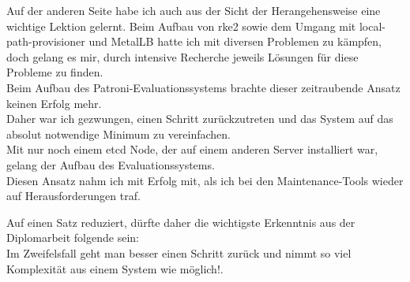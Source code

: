 \begin{flushleft}
    Auf der anderen Seite habe ich auch aus der Sicht der Herangehensweise eine wichtige Lektion gelernt.
    Beim Aufbau von \gls{rke2} sowie dem Umgang mit \gls{local-path-provisioner} und \Gls{MetalLB} hatte ich mit diversen Problemen zu kämpfen,\\
    doch gelang es mir, durch intensive Recherche jeweils Lösungen für diese Probleme zu finden.\\
    Beim Aufbau des Patroni-Evaluationssystems brachte dieser zeitraubende Ansatz keinen Erfolg mehr.\\
    Daher war ich gezwungen, einen Schritt zurückzutreten und das System auf das absolut notwendige Minimum zu vereinfachen.\\
    Mit nur noch einem \gls{etcd} Node, der auf einem anderen Server installiert war, gelang der Aufbau des Evaluationssystems.\\
    Diesen Ansatz nahm ich mit Erfolg mit, als ich bei den Maintenance-Tools wieder auf Herausforderungen traf.
\end{flushleft}
\begin{flushleft}
    Auf einen Satz reduziert, dürfte daher die wichtigste Erkenntnis aus der Diplomarbeit folgende sein:\\
    \guillemotleft Im Zweifelsfall geht man besser einen Schritt zurück und nimmt so viel Komplexität aus einem System wie möglich!\guillemotright.
\end{flushleft}